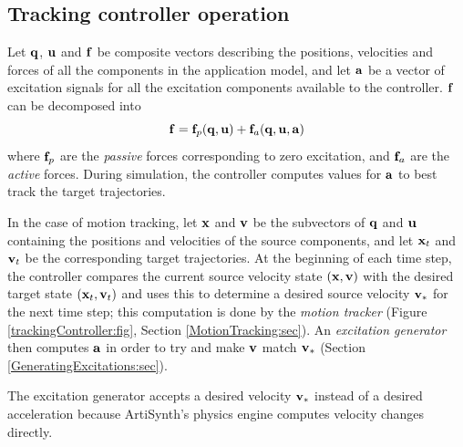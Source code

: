 \subsection{Tracking controller operation}

Let ${\bf q}$, ${\bf u}$ and ${\bf f}$ be composite vectors describing the positions,
velocities and forces of all the components in the application model, and let
${\bf a}$ be a vector of excitation signals for all the excitation components
available to the controller. ${\bf f}$ can be decomposed into
%
\begin{equation}
{\bf f} = {\bf f}_p ({\bf q}, {\bf u}) + {\bf f}_a ({\bf q}, {\bf u}, {\bf a})
\label{fnonlinear:eqn}	
\end{equation}
%
where ${\bf f}_p$ are the {\it passive} forces corresponding to zero excitation, and
${\bf f}_a$ are the {\it active} forces. During simulation, the controller computes
values for ${\bf a}$ to best track the target trajectories.

In the case of motion tracking, let ${\bf x}$ and ${\bf v}$ be the subvectors of ${\bf q}$ and
${\bf u}$ containing the positions and velocities of the source components, and let
${\bf x}_t$ and ${\bf v}_t$ be the corresponding target trajectories. At the beginning of
each time step, the controller compares the current source velocity state
$({\bf x}, {\bf v})$ with the desired target state $({\bf x}_t, {\bf v}_t)$ and uses this to
determine a desired source velocity ${\bf v}_*$ for the next time step;
this computation is done by the {\it motion tracker} (Figure
\ref{trackingController:fig}, Section \ref{MotionTracking:sec}).
An {\it excitation generator} then computes ${\bf a}$ in order to try and make ${\bf v}$
match ${\bf v}_*$ (Section \ref{GeneratingExcitations:sec}).

\begin{sideblock}
The excitation generator accepts a desired velocity ${\bf v}_*$ instead of a desired
acceleration because ArtiSynth's physics engine computes velocity changes
directly.
\end{sideblock}

